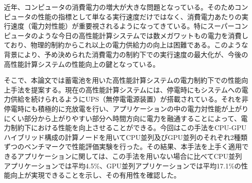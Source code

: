 近年、コンピュータの消費電力の増大が大きな問題となっている。そのためコンピュータの性能の指標として単なる実行速度だけではなく、消費電力あたりの実行速度（電力対性能）が重要視されるようになってきている。特にスーパーコンピュータのような今日の高性能計算システムでは数メガワットもの電力を消費しており、物理的制約からこれ以上の電力供給力の向上は困難である。このような背景により、予め決められた消費電力の制約下での実行速度の最大化が、今後の高性能計算システムの性能向上の鍵となっている。

そこで、本論文では蓄電池を用いた高性能計算システムの電力制約下での性能向上手法を提案する。現在の高性能計算システムには、停電時にもシステムへの電力供給を続けられるようにUPS（無停電電源装置）が搭載されている。それを非停電時にも積極的に充放電を行い、アプリケーションの中の電力対性能が上がりにくい部分から上がりやすい部分へ時間方向に電力を融通することによって、電力制約下における性能を向上させることができる。今回はこの手法をCPU-GPUハイブリッド構成の計算ノードを用いてCPU並列及びGPU並列のそれぞれ2種類ずつのベンチマークで性能評価実験を行った。その結果、本手法を上手く適用できるアプリケーションに関しては、この手法を用いない場合に比べてCPU並列アプリケーションでは平均4.5\%、GPU並列アプリケーションでは平均17.1\%の性能向上が実現できることを示し、その有用性を確認した。
